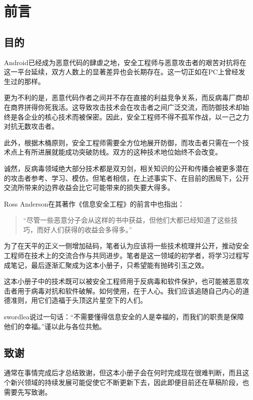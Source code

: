 \chapter{前言}
\section*{目的}
Android已经成为恶意代码的肆虐之地，安全工程师与恶意攻击者的艰苦对抗将在这一平台延续，双方人数上的显著差异也会长期存在。这一切正如在PC上曾经发生过的那样。

更为不利的是，恶意代码作者之间并不存在直接的利益竞争关系，而反病毒厂商却在商界拼得你死我活。这导致攻击技术会在攻击者之间广泛交流，而防御技术却始终是各企业的核心技术而被保密。因此，安全工程师不得不孤军作战，以一己之力对抗无数攻击者。

此外，根据木桶原则，安全工程师需要全方位地展开防御，而攻击者只需在一个技术点上有所进展就能成功突破防线。双方的这种技术地位始终不会改变。

诚然，反病毒领域绝大部分技术都是双刃剑，相关知识的公开和传播会被更多潜在的攻击者参考、学习、模仿。但笔者相信，在上述事实下、在目前的困局下，公开交流所带来的边界收益会比它可能带来的损失要大得多。

Ross Anderson在其著作《信息安全工程》的前言中也指出：
\begin{quote}
  “尽管一些恶意分子会从这样的书中获益，但他们大都已经知道了这些技巧，而好人们获得的收益会多得多。”
\end{quote}

为了在天平的正义一侧增加砝码，笔者认为应该将一些技术梳理并公开，推动安全工程师在技术上的交流合作与共同进步。笔者是这一领域的初学者，将学习过程写成笔记，最后逐渐汇聚成为这本小册子，只希望能有抛砖引玉之效。

这本小册子中的技术既可以被安全工程师用于反病毒和软件保护，也可能被恶意攻击者用于病毒对抗和软件破解。如何使用，在于人心。我们应该追随自己内心的道德准则，用它们造福于头顶这片星空下的人们。

swordlea说过一句话：“不需要懂得信息安全的人是幸福的，而我们的职责是保障他们的幸福。”谨以此与各位共勉。

\section*{致谢}
通常在事情完成后才总结致谢，但这本小册子会在何时完成现在很难判断，而且这个新兴领域的持续发展可能促使它不断更新下去，因此即便目前还在草稿阶段，也需要先写致谢。

